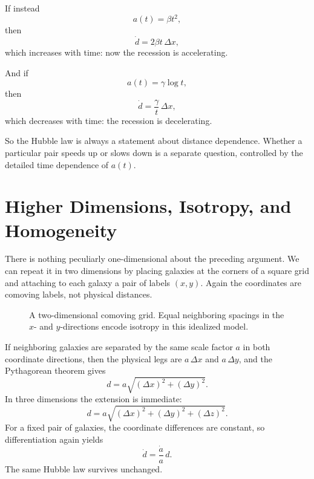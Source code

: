 If instead
\begin{equation}
a(t)=\beta t^2,
\end{equation}
then
\begin{equation}
\dot d = 2\beta t\,\Delta x,
\end{equation}
which increases with time: now the recession is accelerating.

And if
\begin{equation}
a(t)=\gamma \log t,
\end{equation}
then
\begin{equation}
\dot d = \frac{\gamma}{t}\,\Delta x,
\end{equation}
which decreases with time: the recession is decelerating.

So the Hubble law is always a statement about distance dependence. Whether a particular pair speeds up or slows down is a separate question, controlled by the detailed time dependence of \(a(t)\).

\section{Higher Dimensions, Isotropy, and Homogeneity}

There is nothing peculiarly one-dimensional about the preceding argument. We can repeat it in two dimensions by placing galaxies at the corners of a square grid and attaching to each galaxy a pair of labels \((x,y)\). Again the coordinates are comoving labels, not physical distances.

\begin{figure}
\centering
{}
\caption{A two-dimensional comoving grid. Equal neighboring spacings in the \(x\)- and \(y\)-directions encode isotropy in this idealized model.}
\end{figure}

If neighboring galaxies are separated by the same scale factor \(a\) in both coordinate directions, then the physical legs are \(a\,\Delta x\) and \(a\,\Delta y\), and the Pythagorean theorem gives
\begin{equation}
d=a\sqrt{(\Delta x)^2+(\Delta y)^2}.
\end{equation}
In three dimensions the extension is immediate:
\begin{equation}
d=a\sqrt{(\Delta x)^2+(\Delta y)^2+(\Delta z)^2}.
\end{equation}
For a fixed pair of galaxies, the coordinate differences are constant, so differentiation again yields
\begin{equation}
\dot d=\frac{\dot a}{a}\,d.
\end{equation}
The same Hubble law survives unchanged.

